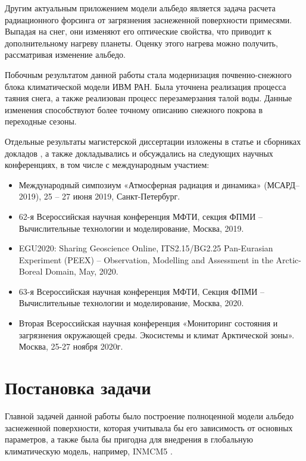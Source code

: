 \documentclass[a4paper, fontsize=14pt]{scrartcl}
\begin{document}
Другим актуальным приложением модели альбедо является задача расчета радиационного форсинга от загрязнения заснеженной поверхности примесями. Выпадая на снег, они изменяют его оптические свойства, что приводит к дополнительному нагреву планеты. Оценку этого нагрева можно получить, рассматривая изменение альбедо. 

Побочным результатом данной работы стала модернизация почвенно-снежного блока климатической модели ИВМ РАН. Была уточнена реализация процесса таяния снега, а также реализован процесс перезамерзания талой воды. Данные изменения способствуют более точному описанию снежного покрова в переходные сезоны.

Отдельные результаты магистерской диссертации изложены в статье \cite{Chernenkov2021rus} и сборниках докладов  \cite{MSARD2019, mipt2019, EGU2020poster, EGU2020, mipt2020, Arctic2020}, а также докладывались и обсуждались на следующих научных конференциях, в том числе с международным участием:
\begin{itemize}
    \item Международный симпозиум «Атмосферная радиация и динамика» (МСАРД–2019), 25 – 27 июня 2019, Санкт-Петербург. \cite{MSARD2019}
    \item 62-я Всероссийская научная конференция МФТИ, секция ФПМИ – Вычислительные технологии и моделирование, Москва, 2019. \cite{mipt2019}
    \item EGU2020: Sharing Geoscience Online, ITS2.15/BG2.25 Pan-Eurasian Experiment (PEEX) – Observation, Modelling and Assessment in the Arctic-Boreal Domain, May, 2020. \cite{EGU2020poster, EGU2020} \sloppy 
    \item 63-я Всероссийская научная конференция МФТИ, Секция ФПМИ – Вычислительные технологии и моделирование, Москва, 2020. \cite{mipt2020}
    \item Вторая Всероссийская научная конференция «Мониторинг состояния и загрязнения окружающей среды. Экосистемы и климат Арктической зоны». Москва, 25-27 ноября 2020г. \cite{Arctic2020}
\end{itemize} 



\newpage
\section{Постановка задачи}

Главной задачей данной работы было построение полноценной модели альбедо заснеженной поверхности, которая учитывала бы его зависимость от основных параметров, а также была бы пригодна для внедрения в глобальную климатическую модель, например, INMCM5 \cite{Volodin2017}. 
\end{document}
